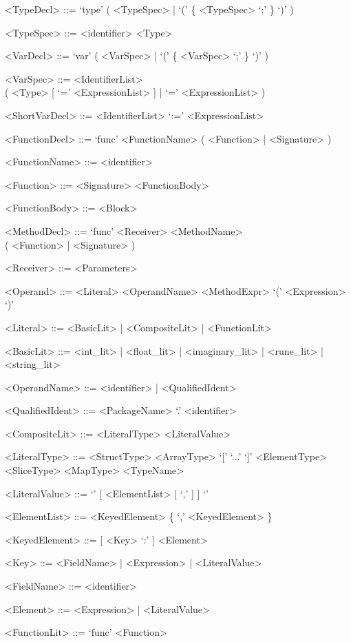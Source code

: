 \documentclass[letterpaper,11pt]{article}
\begin{document}
\begin{appendices}
\begin{grammar}
<TypeDecl>     ::= `type' ( <TypeSpec> | `(' \{ <TypeSpec> `;' \} `)' )

<TypeSpec>     ::= <identifier> <Type>


<VarDecl>     ::= `var' ( <VarSpec> | `(' \{ <VarSpec> `;' \} `)' )

<VarSpec>     ::= <IdentifierList> \\( <Type> [ `=' <ExpressionList> ] | `=' <ExpressionList> )


<ShortVarDecl> ::= <IdentifierList> `:=' <ExpressionList>


<FunctionDecl> ::= `func' <FunctionName> ( <Function> | <Signature> )

<FunctionName> ::= <identifier>

<Function>     ::= <Signature> <FunctionBody>

<FunctionBody> ::= <Block>


<MethodDecl>   ::= `func' <Receiver> <MethodName>\\
( <Function> | <Signature> )

<Receiver>     ::= <Parameters>


<Operand>     ::= <Literal> 
\alt <OperandName>
\alt <MethodExpr>
\alt `(' <Expression> `)'

<Literal>     ::= <BasicLit> | <CompositeLit> | <FunctionLit>

<BasicLit>    ::= <int_lit> | <float_lit> | <imaginary_lit> | <rune_lit> | <string_lit>

<OperandName> ::= <identifier> | <QualifiedIdent>


<QualifiedIdent> ::= <PackageName> `.' <identifier>


<CompositeLit>  ::= <LiteralType> <LiteralValue>

<LiteralType>   ::= <StructType>
\alt <ArrayType>
\alt `[' `...' `]' <ElementType>
\alt <SliceType>
\alt <MapType>
\alt <TypeName>

<LiteralValue>  ::= `{' [ <ElementList> [ `,' ] ] `}'

<ElementList>   ::= <KeyedElement> \{ `,' <KeyedElement> \}

<KeyedElement>  ::= [ <Key> `:' ] <Element>

<Key>           ::= <FieldName> | <Expression> | <LiteralValue>

<FieldName>     ::= <identifier>

<Element>       ::= <Expression> | <LiteralValue>


<FunctionLit> ::= `func' <Function>



\end{grammar}
\end{appendices}
\end{document}
